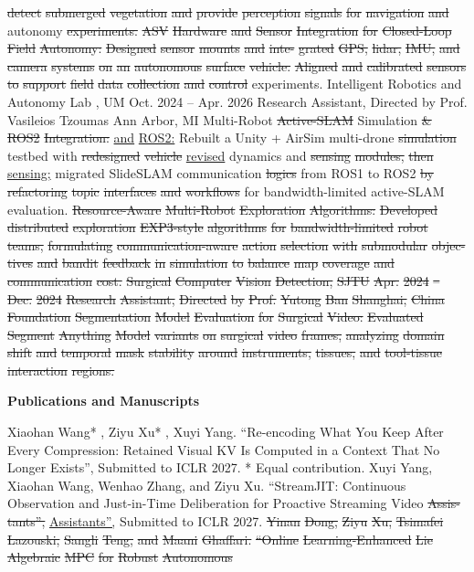 \documentclass[10pt,letterpaper]{article}
\newcommand{\del}[1]{{\color{red}\sout{#1}}}
\newcommand{\add}[1]{{\color{blue}\uline{#1}}}
\begin{document}
\del{detect} \del{submerged} \del{vegetation} \del{and} \del{provide} \del{perception} \del{signals} \del{for} \del{navigation} \del{and} autonomy \del{experiments.} \del{} \del{ASV} \del{Hardware} \del{and} \del{Sensor} \del{Integration} \del{for} \del{Closed-Loop} \del{Field} \del{Autonomy:} \del{Designed} \del{sensor} \del{mounts} \del{and} \del{inte-} \del{grated} \del{GPS,} \del{lidar,} \del{IMU,} \del{and} \del{camera} \del{systems} \del{on} \del{an} \del{autonomous} \del{surface} \del{vehicle.} \del{Aligned} \del{and} \del{calibrated} \del{sensors} \del{to} \del{support} \del{field} \del{data} \del{collection} \del{and} \del{control} experiments. Intelligent Robotics and Autonomy Lab , UM Oct. 2024 -- Apr. 2026 Research Assistant, Directed by Prof. Vasileios Tzoumas Ann Arbor, MI  Multi-Robot \del{Active-SLAM} Simulation \del{\&} \del{ROS2} \del{Integration:} \add{and} \add{ROS2:} Rebuilt a Unity + AirSim multi-drone \del{simulation} testbed with \del{redesigned} \del{vehicle} \add{revised} dynamics and \del{sensing} \del{modules,} \del{then} \add{sensing;} migrated SlideSLAM communication \del{logics} from ROS1 to ROS2 \del{by} \del{refactoring} \del{topic} \del{interfaces} \del{and} \del{workflows} for bandwidth-limited active-SLAM evaluation. \del{} \del{Resource-Aware} \del{Multi-Robot} \del{Exploration} \del{Algorithms:} \del{Developed} \del{distributed} \del{exploration} \del{EXP3-style} \del{algorithms} \del{for} \del{bandwidth-limited} \del{robot} \del{teams,} \del{formulating} \del{communication-aware} \del{action} \del{selection} \del{with} \del{submodular} \del{objec-} \del{tives} \del{and} \del{bandit} \del{feedback} \del{in} \del{simulation} \del{to} \del{balance} \del{map} \del{coverage} \del{and} \del{communication} \del{cost.} \del{Surgical} \del{Computer} \del{Vision} \del{Detection,} \del{SJTU} \del{Apr.} \del{2024} \del{--} \del{Dec.} \del{2024} \del{Research} \del{Assistant,} \del{Directed} \del{by} \del{Prof.} \del{Yutong} \del{Ban} \del{Shanghai,} \del{China} \del{} \del{Foundation} \del{Segmentation} \del{Model} \del{Evaluation} \del{for} \del{Surgical} \del{Video:} \del{Evaluated} \del{Segment} \del{Anything} \del{Model} \del{variants} \del{on} \del{surgical} \del{video} \del{frames,} \del{analyzing} \del{domain} \del{shift} \del{and} \del{temporal} \del{mask} \del{stability} \del{around} \del{instruments,} \del{tissues,} \del{and} \del{tool-tissue} \del{interaction} \del{regions.} \par\medskip\textbf{Publications and Manuscripts}\par   Xiaohan Wang* , Ziyu Xu* , Xuyi Yang. ``Re-encoding What You Keep After Every Compression: Retained Visual KV Is Computed in a Context That No Longer Exists'', Submitted to ICLR 2027. * Equal contribution.  Xuyi Yang, Xiaohan Wang, Wenhao Zhang, and Ziyu Xu. ``StreamJIT: Continuous Observation and Just-in-Time Deliberation for Proactive Streaming Video \del{Assis-} \del{tants'',} \add{Assistants'',} Submitted to ICLR 2027. \del{} \del{Yinan} \del{Dong,} \del{Ziyu} \del{Xu,} \del{Tsimafei} \del{Lazouski,} \del{Sangli} \del{Teng,} \del{and} \del{Maani} \del{Ghaffari.} \del{``Online} \del{Learning-Enhanced} \del{Lie} \del{Algebraic} \del{MPC} \del{for} \del{Robust} \del{Autonomous} 
\end{document}
